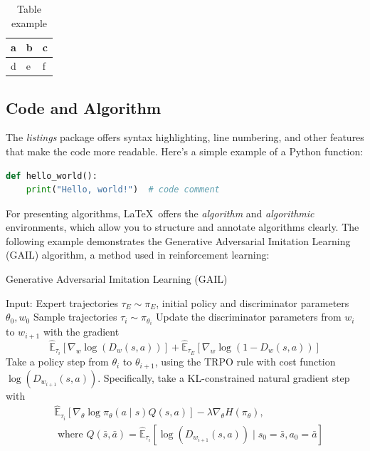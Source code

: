 \begin{table}[h!]
\centering
\begin{tabular}{|l|l|l|}
\hline
a & b & c \\ \hline
d & e & f \\ \hline
\end{tabular}
\caption{Table example}
\label{tab1}
\end{table}

\subsection{Code and Algorithm}
The \textit{listings} package offers syntax highlighting, line numbering, and other features that make the code more readable. Here’s a simple example of a Python function:

\begin{lstlisting}[language=Python]
def hello_world():
    print("Hello, world!")  # code comment
\end{lstlisting}

For presenting algorithms, \LaTeX\ offers the \textit{algorithm} and \textit{algorithmic} environments, which allow you to structure and annotate algorithms clearly. The following example demonstrates the Generative Adversarial Imitation Learning (GAIL) algorithm, a method used in reinforcement learning:

\begin{algorithm}
    \caption{Generative Adversarial Imitation Learning (GAIL)}
    \label{alg1}
    \begin{algorithmic}[1]
    \State Input: Expert trajectories $\tau_E \sim \pi_E$, initial policy and discriminator parameters $\theta_0, w_0$
        \State Sample trajectories $\tau_i \sim \pi_{\theta_i}$
        \State Update the discriminator parameters from $w_i$ to $w_{i+1}$ with the gradient
        $$
            \hat{\mathbb{E}}_{\tau_i}\left[\nabla_w \log \left(D_w(s, a)\right)\right]+\hat{\mathbb{E}}_{\tau_E}\left[\nabla_w \log \left(1-D_w(s, a)\right)\right]
        $$
        \State Take a policy step from $\theta_i$ to $\theta_{i+1}$, using the TRPO rule with cost function $\log \left(D_{w_{i+1}}(s, a)\right)$. Specifically, take a KL-constrained natural gradient step with
        \begin{align*}
            & \hat{\mathbb{E}}_{\tau_i}\left[\nabla_\theta \log \pi_\theta(a \mid s) Q(s, a)\right]-\lambda \nabla_\theta H\left(\pi_\theta\right), \\
            & \text { where } Q(\bar{s}, \bar{a})=\hat{\mathbb{E}}_{\tau_i}\left[\log \left(D_{w_{i+1}}(s, a)\right) \mid s_0=\bar{s}, a_0=\bar{a}\right]
        \end{align*}
    \EndFor
    \end{algorithmic}
\end{algorithm}


